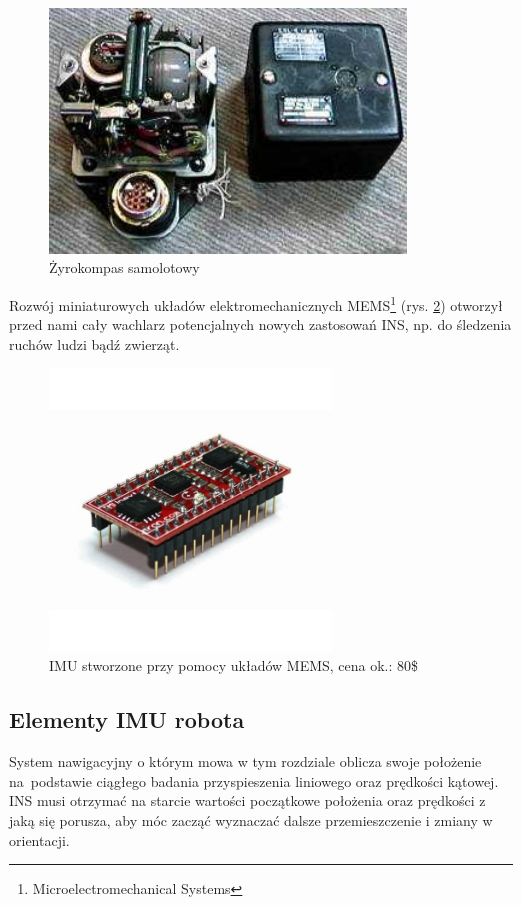 \begin{figure}[!ht]
 \centering \includegraphics[height=65mm]{../images/ch04/gyrocompass.jpg}
 \caption[Żyrokompas samolotowy]{Żyrokompas samolotowy\footnotemark}
 \label{fig:ZyrokompasSamolotowy}
\end{figure}

Rozwój miniaturowych układów elektromechanicznych
MEMS\footnote{Microelectromechanical Systems} (rys. \ref{fig:IMUMEMS}) otworzył
przed nami cały wachlarz potencjalnych nowych zastosowań INS, np. do śledzenia
ruchów ludzi bądź zwierząt.

\begin{figure}[!ht]
 \centering \includegraphics[height=75mm]{../images/ch04/mems_imu.jpg}
 \caption[IMU stworzone przy pomocy układów MEMS]{IMU stworzone przy pomocy
 układów MEMS, cena ok.: 80\$\footnotemark}
 \label{fig:IMUMEMS}
\end{figure}

\subsection{Elementy IMU robota}
System nawigacyjny o którym mowa w tym rozdziale oblicza swoje położenie
na~podstawie ciągłego badania przyspieszenia liniowego oraz prędkości kątowej.
INS musi otrzymać na starcie wartości początkowe położenia oraz prędkości z jaką
się porusza, aby móc zacząć wyznaczać dalsze przemieszczenie i zmiany w
orientacji.

